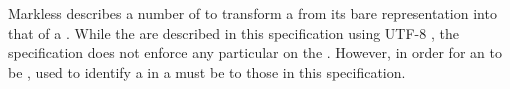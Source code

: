 Markless describes a number of  to transform a  from its bare  representation into that of a . While the  are described in this specification using UTF-8 , the specification does not enforce any particular  on the . However, in order for an  to be ,  used to identify a  in a  must be  to those in this specification. \\



